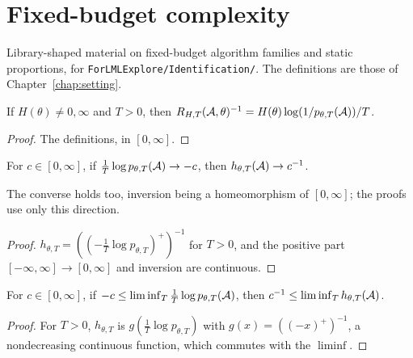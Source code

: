 \chapter{Fixed-budget complexity}
\label{chap:prereq_complexity}

Library-shaped material on fixed-budget algorithm families and static proportions, for
\texttt{ForLMLExplore/Identification/}. The definitions are those of Chapter~\ref{chap:setting}.

\begin{lemma}
  \label{lem:inv_difficultyRatio}
  \leanok
  If $H(\theta) \ne 0, \infty$ and $T > 0$, then $R_{H,T}(\mathcal{A}, \theta)^{-1} = H(\theta)
  \log(1/p_{\theta,T}(\mathcal{A})) / T$.
\end{lemma}

\begin{proof}
  \leanok
  The definitions, in $[0, \infty]$.
\end{proof}

\begin{lemma}
  \label{lem:tendsto_errorRate_iff}
  \leanok
  For $c \in [0, \infty]$, if $\frac1T \log p_{\theta, T}(\mathcal{A}) \to -c$, then
  $h_{\theta, T}(\mathcal{A}) \to c^{-1}$.
\end{lemma}

The converse holds too, inversion being a homeomorphism of $[0, \infty]$; the proofs use only this
direction.

\begin{proof}
  \leanok
  $h_{\theta, T} = ((-\frac1T \log p_{\theta, T})^{+})^{-1}$ for $T > 0$, and the positive part
  $[-\infty, \infty] \to [0, \infty]$ and inversion are continuous.
\end{proof}

\begin{lemma}
  \label{lem:le_liminf_errorRate}
  \leanok
  For $c \in [0, \infty]$, if $-c \le \liminf_T \frac1T \log p_{\theta, T}(\mathcal{A})$, then
  $c^{-1} \le \liminf_T h_{\theta, T}(\mathcal{A})$.
\end{lemma}

\begin{proof}
  \leanok
  For $T > 0$, $h_{\theta, T}$ is $g(\frac1T \log p_{\theta, T})$ with $g(x) = ((-x)^{+})^{-1}$,
  a nondecreasing continuous function, which commutes with the $\liminf$.
\end{proof}


